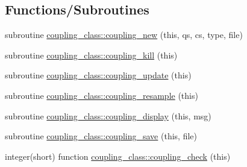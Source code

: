 \subsection*{Functions/\+Subroutines}
\begin{DoxyCompactItemize}
\item 
subroutine \hyperlink{namespacecoupling__class_a5fa07e475bf96111bc76820037fc26a4}{coupling\+\_\+class\+::coupling\+\_\+new} (this, qs, cs, type, file)
\item 
subroutine \hyperlink{namespacecoupling__class_a774339d5b87453601c0664a199df7823}{coupling\+\_\+class\+::coupling\+\_\+kill} (this)
\item 
subroutine \hyperlink{namespacecoupling__class_a034f9e137631afdb03a75cc32bf1956d}{coupling\+\_\+class\+::coupling\+\_\+update} (this)
\item 
subroutine \hyperlink{namespacecoupling__class_ad26da11333ea64f68c25250a35287a51}{coupling\+\_\+class\+::coupling\+\_\+resample} (this)
\item 
subroutine \hyperlink{namespacecoupling__class_a543d9a76307b2c60048d8f390fb40859}{coupling\+\_\+class\+::coupling\+\_\+display} (this, msg)
\item 
subroutine \hyperlink{namespacecoupling__class_af46ffcc2d49425d21e248f173b5377bd}{coupling\+\_\+class\+::coupling\+\_\+save} (this, file)
\item 
integer(short) function \hyperlink{namespacecoupling__class_a41b687a0ad543c445aa29923c229e39d}{coupling\+\_\+class\+::coupling\+\_\+check} (this)
\end{DoxyCompactItemize}
